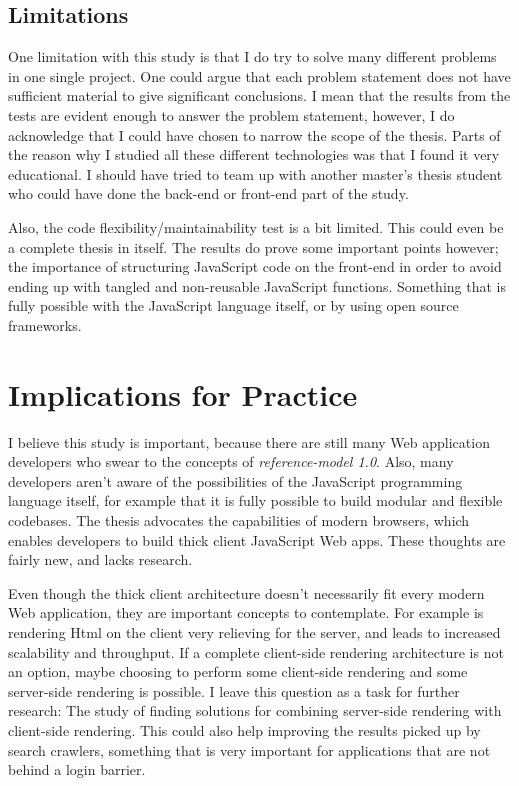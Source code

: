 \subsection{Limitations}
One limitation with this study is that I do try to solve many different problems in one single project. One could argue that each problem statement does not have sufficient material to give significant conclusions. I mean that the results from the tests are evident enough to answer the problem statement, however, I do acknowledge that I could have chosen to narrow the scope of the thesis. Parts of the reason why I studied all these different technologies was that I found it very educational. I should have tried  to team up with another master's thesis student who could have done the back-end or front-end part of the study. 

Also, the code flexibility/maintainability test is a bit limited. This could even be a complete thesis in itself. The results do prove some important points however; the importance of structuring JavaScript code on the front-end in order to avoid ending up with tangled and non-reusable JavaScript functions. Something that is fully possible with the JavaScript language itself, or by using open source frameworks. 

\section{Implications for Practice}
I believe this study is important, because there are still many Web application developers who swear to the concepts of \textit{reference-model 1.0}. Also, many developers aren't aware of the possibilities of the JavaScript programming language itself, for example that it is fully possible to build modular and flexible codebases. The thesis advocates the capabilities of modern browsers, which enables developers to build thick client JavaScript Web apps. These thoughts are fairly new, and lacks research.

Even though the thick client architecture doesn't necessarily fit every modern Web application, they are important concepts to contemplate. For example is rendering Html on the client very relieving for the server, and leads to increased scalability and throughput. If a complete client-side rendering architecture is not an option, maybe choosing to perform some client-side rendering and some server-side rendering is possible. I leave this question as a task for further research: The study of finding solutions for combining server-side rendering with client-side rendering. This could also help improving the results picked up by search crawlers, something that is very important for applications that are not behind a login barrier.

